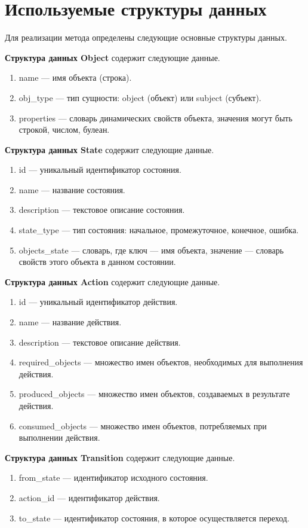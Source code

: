 \section{Используемые структуры данных}

Для реализации метода определены следующие основные структуры данных.

\textbf{Структура данных Object} содержит следующие данные.
\begin{enumerate}
    \item name --- имя объекта (строка).
    \item obj\_type --- тип сущности: object (объект) или subject (субъект).
    \item properties --- словарь динамических свойств объекта, значения могут быть строкой, числом, булеан.
\end{enumerate}

\textbf{Структура данных State} содержит следующие данные.
\begin{enumerate}
    \item id --- уникальный идентификатор состояния.
    \item name --- название состояния.
    \item description --- текстовое описание состояния.
    \item state\_type --- тип состояния: начальное, промежуточное, конечное, ошибка.
    \item objects\_state --- словарь, где ключ --- имя объекта, значение --- словарь свойств этого объекта в данном состоянии.
\end{enumerate}

\textbf{Структура данных Action} содержит следующие данные.
\begin{enumerate}
    \item id --- уникальный идентификатор действия.
    \item name --- название действия.
    \item description --- текстовое описание действия.
    \item required\_objects --- множество имен объектов, необходимых для выполнения действия.
    \item produced\_objects --- множество имен объектов, создаваемых в результате действия.
    \item consumed\_objects --- множество имен объектов, потребляемых при выполнении действия.
\end{enumerate}

\textbf{Структура данных Transition} содержит следующие данные.
\begin{enumerate}
    \item from\_state --- идентификатор исходного состояния.
    \item action\_id --- идентификатор действия.
    \item to\_state --- идентификатор состояния, в которое осуществляется переход.
\end{enumerate}

